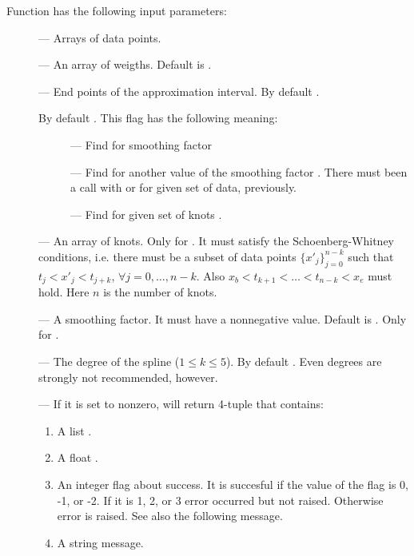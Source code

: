 Function  has the following input parameters:
\begin{description}
\item[] --- Arrays of data points.
\item[] --- An array of weigths. Default is
  .
\item[] --- End points of the approximation
  interval. By default .
\item[] By default . This flag has the
  following meaning:
  \begin{description}
  \item[] --- Find  for smoothing factor
  \item[] --- Find  for another value of the
    smoothing factor . There must been a call with
     or  for given set of data, previously.
  \item[] --- Find  for given set of knots
    .
  \end{description}
\item[] --- An array of knots. Only for . It
  must satisfy the Schoenberg-Whitney conditions, i.e. there must be a
  subset of data points $\{x'_j\}_{j=0}^{n-k}$ such that
  $t_j<x'_j<t_{j+k}$, $\forall j=0,\ldots,n-k$. Also
  $x_b<t_{k+1}<\ldots<t_{n-k}<x_e$ must hold. Here $n$ is the number
  of knots.
\item[] --- A smoothing factor. It must have a nonnegative
  value. Default is . Only for .
\item[] --- The degree of the spline ($1\leqslant k\leqslant
  5$). By default . Even degrees are strongly not
  recommended, however.
\item[] --- If it is set to nonzero, 
  will return 4-tuple that contains:
  \begin{enumerate}
  \item A list .
  \item A float .
  \item An integer flag about  success. It is succesful
    if the value of the flag is 0, -1, or -2. If it is 1, 2, or 3
    error occurred but not raised. Otherwise error is raised. See also
    the following message.
  \item A string message.

\end{enumerate}
\end{description}
